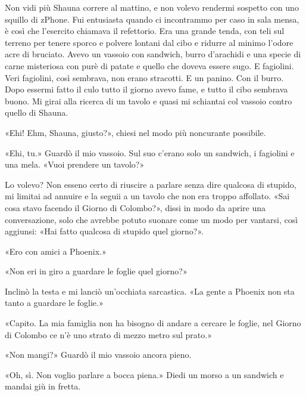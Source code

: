 \hfill\break

Non vidi più Shauna correre al mattino, e non volevo rendermi sospetto
con uno squillo di zPhone. Fui entusiasta quando ci incontrammo per caso
in sala mensa, è così che l'esercito chiamava il refettorio. Era una
grande tenda, con teli sul terreno per tenere sporco e polvere lontani
dal cibo e ridurre al minimo l'odore acre di bruciato. Avevo un vassoio
con sandwich, burro d'arachidi e una specie di carne misteriosa con purè
di patate e quello che doveva essere sugo. E fagiolini. Veri fagiolini,
così sembrava, non erano stracotti. E un panino. Con il burro. Dopo
essermi fatto il culo tutto il giorno avevo fame, e tutto il cibo
sembrava buono. Mi girai alla ricerca di un tavolo e quasi mi schiantai
col vassoio contro quello di Shauna.

«Ehi! Ehm, Shauna, giusto?», chiesi nel modo più noncurante possibile.

«Ehi, tu.» Guardò il mio vassoio. Sul suo c'erano solo un sandwich, i
fagiolini e una mela. «Vuoi prendere un tavolo?»

Lo volevo? Non esseno certo di riuscire a parlare senza dire qualcosa di
stupido, mi limitai ad annuire e la seguii a un tavolo che non era
troppo affollato. «Sai cosa stavo facendo il Giorno di Colombo?», dissi
in modo da aprire una conversazione, solo che avrebbe potuto suonare
come un modo per vantarsi, così aggiunsi: «Hai fatto qualcosa di stupido
quel giorno?».

«Ero con amici a Phoenix.»

«Non eri in giro a guardare le foglie quel giorno?»

Inclinò la testa e mi lanciò un'occhiata sarcastica. «La gente a Phoenix
non sta tanto a guardare le foglie.»

«Capito. La mia famiglia non ha bisogno di andare a cercare le foglie,
nel Giorno di Colombo ce n'è uno strato di mezzo metro sul prato.»

«Non mangi?» Guardò il mio vassoio ancora pieno.

«Oh, sì. Non voglio parlare a bocca piena.» Diedi un morso a un sandwich
e mandai giù in fretta.

